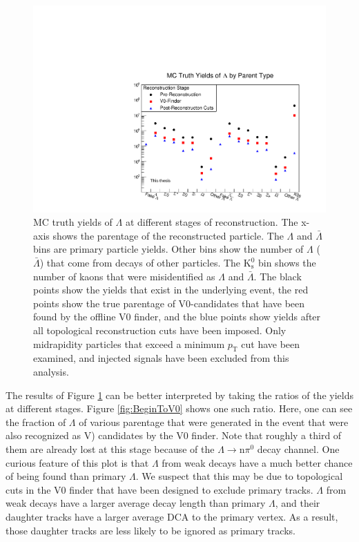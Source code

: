 \begin{figure}[hbtp]
\includegraphics[width=36pc]{Figures/2014-02-03-MCYields.pdf}
\caption[$\Lambda$ MC Yields at Different Reconstruction Stages]{
MC truth yields of $\Lambda$ at different stages of reconstruction.
The x-axis shows the parentage of the reconstructed particle. 
The $\Lambda$ and $\bar{\Lambda}$ bins are primary particle yields.  
Other bins show the number of $\Lambda$ ($\bar{\Lambda}$) that come from decays of other particles. 
The $\mathrm{K^0_s}$ bin shows the number of kaons that were misidentified as $\Lambda$ and $\bar{\Lambda}$.
The black points show the yields that exist in the underlying event, the red points show the true parentage of V0-candidates that have been found by the offline V0 finder, and the blue points show yields after all topological reconstruction cuts have been imposed.
Only midrapidity particles that exceed a minimum $p_\mathrm{T}$ cut have been examined, and injected signals have been excluded from this analysis.}
\label{fig:MCYields}
\end{figure}

The results of Figure \ref{fig:MCYields} can be better interpreted by taking the ratios of the yields at different stages.  
Figure \ref{fig:BeginToV0} shows one such ratio.
Here, one can see the fraction of $\Lambda$ of various parentage that were generated in the event that were also recognized as V) candidates by the V0 finder.
Note that roughly a third of them are already lost at this stage because of the $\Lambda \rightarrow \mathrm{n}\pi^0$ decay channel.
One curious feature of this plot is that $\Lambda$ from weak decays have a much better chance of being found than primary $\Lambda$.
We suspect that this may be due to topological cuts in the V0 finder that have been designed to exclude primary tracks.
$\Lambda$ from weak decays have a larger average decay length than primary $\Lambda$, and their daughter tracks have a larger average DCA to the primary vertex.
As a result, those daughter tracks are less likely to be ignored as primary tracks.

